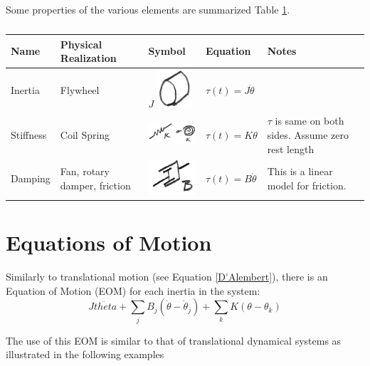 Some properties of the various elements are summarized Table \ref{RotElementsTable}.


\begin{table}
\begin{tabular}{|l|l|l|l|p{2.5in}|} \hline
 Name             &  Physical Realization        &   Symbol    &  Equation              & Notes   \\ \hline
  Inertia         &  Flywheel                    &   $J$ \includegraphics[width=0.5in]{figs03/00740a.png}     &  $\tau(t) = J\ddot{\theta}$    &  \\ \hline
  Stiffness       &  Coil  Spring                &       \includegraphics[width=1.0in]{figs03/00740b.png}    &  $\tau(t) = K{\theta}$         & $\tau$ is same on both sides.  Assume zero rest length \\ \hline 
  Damping         & Fan, rotary damper, friction &       \includegraphics[width=1.0in]{figs03/00740c.png}    &  $\tau(t) = B\dot{\theta}$     & This is a linear model for friction.     \\ \hline
\end{tabular}\caption{}\label{RotElementsTable}
\end{table}



\section{Equations of Motion}
Similarly to translational motion (see Equation \ref{D'Alembert}), there is an Equation of Motion (EOM) for each inertia in the system:
\[
J\ddot{theta} + \sum_j B_j(\dot{\theta} -\dot{\theta}_j) + \sum_kK(\theta-\theta_k)
\]

The use of this EOM is similar to that of translational dynamical systems as illustrated in the following examples

